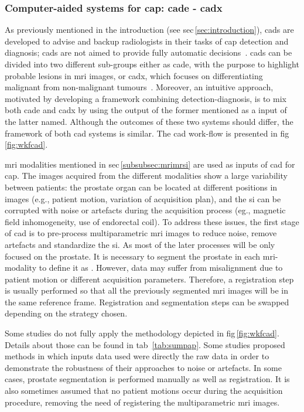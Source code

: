 \subsubsection{Computer-aided systems for \ac{cap}: \ac{cade} - \ac{cadx}} \label{subsubsec:CAD}

As previously mentioned in the introduction (see \acs{sec}\,\ref{sec:introduction}), \acp{cad} are developed to advise and backup radiologists in their tasks of \ac{cap} detection and diagnosis; \acp{cad} are not aimed to provide fully automatic decisions~\cite{Giger2008}. \acp{cad} can be divided into two different sub-groups either as \ac{cade}, with the purpose to highlight probable lesions in \ac{mri} images, or \ac{cadx}, which focuses on differentiating malignant from non-malignant tumours~\cite{Giger2008}. Moreover, an intuitive approach, motivated by developing a framework combining detection-diagnosis, is to mix both \ac{cade} and \ac{cadx} by using the output of the former mentioned as a input of the latter named. Although the outcomes of these two systems should differ, the framework of both \ac{cad} systems is similar. The \ac{cad} work-flow is presented in \acs{fig}\,\ref{fig:wkfcad}.

\ac{mri} modalities mentioned in \acs{sec}\,\ref{subsubsec:mrimrsi} are used as inputs of \ac{cad} for \ac{cap}. The images acquired from the different modalities show a large variability between patients: the prostate organ can be located at different positions in images (e.g., patient motion, variation of acquisition plan), and the \ac{si} can be corrupted with noise or artefacts during the acquisition process (eg., magnetic field inhomogeneity, use of endorectal coil). To address these issues, the first stage of \ac{cad} is to pre-process multiparametric \ac{mri} images to reduce noise, remove artefacts and standardize the \ac{si}. As most of the later processes will be only focused on the prostate. It is necessary to segment the prostate in each \ac{mri}-modality to define it as . However, data may suffer from misalignment due to patient motion or different acquisition parameters. Therefore, a registration step is usually performed so that all the previously segmented \ac{mri} images will be in the same reference frame. Registration and segmentation steps can be swapped depending on the strategy chosen.

Some studies do not fully apply the methodology depicted in \acs{fig}\,\ref{fig:wkfcad}. Details about those can be found in \acs{tab}~\ref{tab:sumpap}. Some studies proposed methods in which inputs data used were directly the raw data in order to demonstrate the robustness of their approaches to noise or artefacts. In some cases, prostate segmentation is performed manually as well as registration. It is also sometimes assumed that no patient motions occur during the acquisition procedure, removing the need of registering the multiparametric \ac{mri} images.

